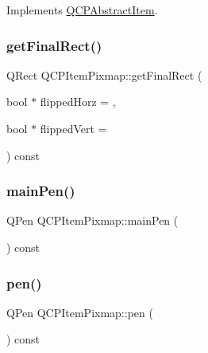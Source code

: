 Implements \mbox{\hyperlink{class_q_c_p_abstract_item_a007fdab79c935a5da5aa04a21d268c18}{Q\+C\+P\+Abstract\+Item}}.

\mbox{\label{class_q_c_p_item_pixmap_a4e7d803e5093c457a109f8fae56677c2}} 
\subsubsection{\texorpdfstring{getFinalRect()}{getFinalRect()}}
{\footnotesize\ttfamily Q\+Rect Q\+C\+P\+Item\+Pixmap\+::get\+Final\+Rect (\begin{DoxyParamCaption}\item[{bool $\ast$}]{flipped\+Horz = {},  }\item[{bool $\ast$}]{flipped\+Vert = {} }\end{DoxyParamCaption}) const\hspace{0.3cm}{\ttfamily [protected]}}

\mbox{\label{class_q_c_p_item_pixmap_aad6dddd67163831538d40023a98a9fe7}} 
\subsubsection{\texorpdfstring{mainPen()}{mainPen()}}
{\footnotesize\ttfamily Q\+Pen Q\+C\+P\+Item\+Pixmap\+::main\+Pen (\begin{DoxyParamCaption}{ }\end{DoxyParamCaption}) const\hspace{0.3cm}{\ttfamily [protected]}}

\mbox{\label{class_q_c_p_item_pixmap_a6ae9922eba6386a5ac4e2a569ec29e1f}} 
\subsubsection{\texorpdfstring{pen()}{pen()}}
{\footnotesize\ttfamily Q\+Pen Q\+C\+P\+Item\+Pixmap\+::pen (\begin{DoxyParamCaption}{ }\end{DoxyParamCaption}) const\hspace{0.3cm}{\ttfamily [inline]}}

